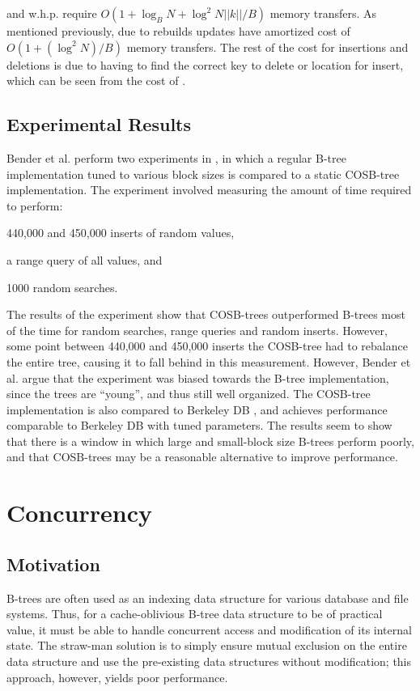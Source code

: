 \documentclass[preprint]{style}
\begin{document}
\Insertkonly{} and \Delete{} w.h.p. require $O(1+\log_{B}N+\log^{2}N||k||/B)$
memory transfers. As mentioned previously, due to rebuilds updates have
amortized cost of $O(1+(\log^{2}N)/B)$ memory transfers. The rest of the cost
for insertions and deletions is due to having to find the correct key to
delete or location for insert, which can be seen from the cost of \Search{}.

\subsection{Experimental Results}
Bender et al. perform two experiments in \cite{BenderFaKu06}, in which a
regular B-tree implementation tuned to various block sizes is compared to a
static COSB-tree implementation. The experiment involved measuring the amount
of time required to perform:
\begin{inparaenum}[(a)]
  \item 440,000 and 450,000 inserts of random values, 
  \item a range query of all values, and 
  \item 1000 random searches.
\end{inparaenum} The results of the
experiment show that COSB-trees outperformed B-trees most of the time for
random searches, range queries and random inserts. However, some point between
440,000 and 450,000 inserts the COSB-tree had to rebalance the entire tree,
causing it to fall behind in this measurement. However, Bender et al. argue
that the experiment was biased towards the B-tree implementation, since the
trees are ``young'', and thus still well organized. The COSB-tree
implementation is also compared to Berkeley DB \cite{BerkeleyDB}, and achieves
performance comparable to Berkeley DB with tuned parameters. The results seem
to show that there is a window in which large and small-block size B-trees
perform poorly, and that COSB-trees may be a reasonable alternative to improve
performance. 

\section{Concurrency}

\subsection{Motivation}

B-trees are often used as an indexing data structure for various database and
file systems. Thus, for a cache-oblivious B-tree data structure to be of
practical value, it must be able to handle concurrent access and modification
of its internal state. The straw-man solution is to simply ensure mutual
exclusion on the entire data structure and use the pre-existing data structures
without modification; this approach, however, yields poor performance.
\end{document}
